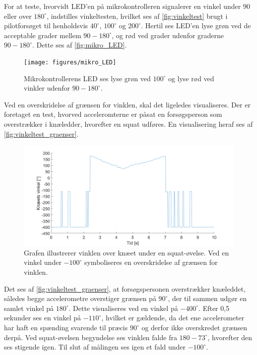 For at teste, hvorvidt LED'en på mikrokontrolleren signalerer en vinkel under $90$ eller over $180^{\circ}$, indstilles vinkeltesten, hvilket ses af \autoref{fig:vinkeltest} brugt i pilotforsøget til henholdsvis $40^{\circ}$, $100^{\circ}$ og $200^{\circ}$. Hertil ses LED'en lyse grøn ved de acceptable grader mellem $90-180^{\circ}$, og rød ved grader udenfor graderne $90-180^{\circ}$. Dette ses af \autoref{fig:mikro_LED}.

\begin{figure}[H]
\centering
\texttt{[image: figures/mikro\_LED]}
\caption{Mikrokontrollerens LED ses lyse grøn ved $100^{\circ}$ og lyse rød ved vinkler udenfor $90-180^{\circ}$.}
\label{fig:mikro_LED}
\end{figure}

\noindent
Ved en overskridelse af grænsen for vinklen, skal det ligeledes visualiseres. Der er foretaget en test, hvorved acceleromterne er påsat en forsøgsperson som overstrækker i knæledder, hvorefter en squat udføres. En visualisering heraf ses af \autoref{fig:vinkeltest_graenser}.

\begin{figure}[H]
\centering
\includegraphics[width=1\textwidth]{figures/vinkeltest_graenser}
\caption{Grafen illustrerer vinklen over knæet under en squat-øvelse. Ved en vinkel under $-100^{\circ}$ symboliseres en overskridelse af grænsen for vinklen. }
\label{fig:vinkeltest_graenser}
\end{figure}

\noindent
Det ses af \autoref{fig:vinkeltest_graenser}, at forsøgspersonen overstrækker knæleddet, således begge accelerometre overstiger grænsen på $90^{\circ}$, der til sammen udgør en samlet vinkel på $180^{\circ}$. Dette visualiseres ved en vinkel på $-400^{\circ}$. 
Efter 0,5 sekunder ses en vinkel på $-110^{\circ}$, hvilket er gældende, da det ene accelerometer har haft en spænding svarende til præcis $90^{\circ}$ og derfor ikke overskredet grænsen derpå. Ved squat-øvelsen begyndelse ses vinklen falde fra $180-73^{\circ}$, hvorefter den ses stigende igen. Til slut af målingen ses igen et fald under $-100^{\circ}$.


